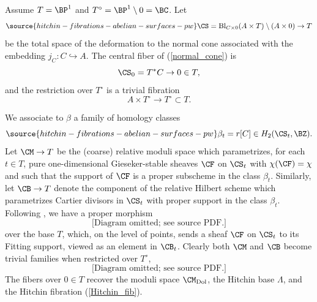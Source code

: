 Assume $T = \BP^1$ and $T^\circ = \BP^1 \setminus 0 = \BC$. Let
\begin{equation}\label{normal_cone}
\source{hitchin-fibrations-abelian-surfaces-pw}
 \CS = \mathrm{Bl}_{C\times 0}(A \times T) \setminus (A\times 0) \to T
\end{equation}
be the total space of the deformation to the normal cone associated with the embedding $j_C:C\hookrightarrow A$. The central fiber of (\ref{normal_cone}) is
\[
\CS_0 = T^*C \to 0 \in T,
\]
and the restriction over $T^\circ$ is a trivial fibration
\[
A \times T^\circ \to  T^\circ \subset T.
\]


We associate to $\beta$ a family of homology classes
\begin{equation}\label{beta_t}
\source{hitchin-fibrations-abelian-surfaces-pw}
\beta_t = r[C] \in H_2(\CS_t, \BZ).
\end{equation}
Let $\CM \rightarrow T$ be the (coarse) relative moduli space which parametrizes, for each $t \in T$, pure one-dimensional Gieseker-stable sheaves $\CF$ on $\CS_t$ with $\chi(\CF) =\chi$ and such that the support of $\CF$ is a proper subscheme in the class $\beta_t$. Similarly, let $\CB \rightarrow T$ denote the component of the relative Hilbert scheme which parametrizes Cartier divisors in $\CS_t$ with proper support in the class $\beta_t$.  Following \cite[Section 5.3]{GIT}, we have a proper morphism
\begin{equation*}
\text{[Diagram omitted; see source PDF.]}
\end{equation*}
over the base $T$, which, on the level of points, sends a sheaf $\CF$ on $\CS_t$ to its Fitting support, viewed as an element in $\CB_t$.
Clearly both $\CM$ and $\CB$ become trivial families when restricted over $T^\circ$,
\begin{equation*}
\text{[Diagram omitted; see source PDF.]}
\end{equation*}
The fibers over $0 \in T$ recover the moduli space $\CM_{\mathrm{Dol}}$, the Hitchin base $\Lambda$, and the Hitchin fibration (\ref{Hitchin_fib}).



